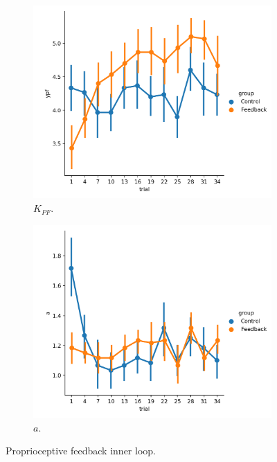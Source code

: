 \begin{figure}[t]
    \centering
    \begin{subfigure}[h]{0.49\textwidth}
        \centering
        \includegraphics[width=\linewidth]{figures/ypf.png}
        \caption[$K_{PF}$]{$K_{PF}$.}
        \label{fig:sm_ypf}
    \end{subfigure}
    \hfill
    \begin{subfigure}[h]{0.49\textwidth}
        \centering
        \includegraphics[width=\linewidth]{figures/a.png}
        \caption[$a$]{$a$.}
        \label{fig:sm_a}
    \end{subfigure}
    \caption[Proprioceptive feedback inner loop]{Proprioceptive feedback inner loop.}
\end{figure}

